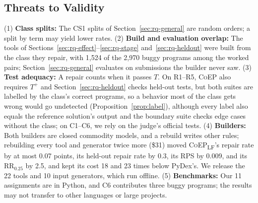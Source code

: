 \documentclass[acmsmall,screen,review,anonymous,nonacm]{acmart}
\newcommand{\tool}{\textsc{CoEP}\xspace}
\newcommand{\coepLF}{\textsc{CoEP}\textsubscript{LF}\xspace}
\begin{document}
\subsection{Threats to Validity}
\label{sec:threats}

(1) \textbf{Class splits:} The CS1 splits of Section~\ref{sec:rq-general} are random orders; a split by term may yield lower rates. (2) \textbf{Build and evaluation overlap:} The tools of Sections~\ref{sec:rq-effect}--\ref{sec:rq-stage} and~\ref{sec:rq-heldout} were built from the class they repair, with 1{,}524 of the 2{,}970 buggy programs among the worked pairs; Section~\ref{sec:rq-general} evaluates on submissions the builder never saw. (3) \textbf{Test adequacy:} A repair counts when it passes $T$. On R1--R5, \tool also requires $T^{+}$ and Section~\ref{sec:rq-heldout} checks held-out tests, but both suites are labelled by the class's correct programs, so a behavior most of the class gets wrong would go undetected (Proposition~\ref{prop:label}), although every label also equals the reference solution's output and the boundary suite checks edge cases without the class; on C1--C6, we rely on the judge's official tests. (4) \textbf{Builders:} Both builders are closed commodity models, and a rebuild writes other rules; rebuilding every tool and generator twice more (\$31) moved \coepLF's repair rate by at most 0.07 points, its held-out repair rate by 0.3, its RPS by 0.009, and its $\mathrm{RR}_{0.25}$ by 2.5, and kept its cost 18 and 23 times below PyDex's. We release the 22 tools and 10 input generators, which run offline. (5) \textbf{Benchmarks:} Our 11 assignments are in Python, and C6 contributes three buggy programs; the results may not transfer to other languages or large projects.
\end{document}
